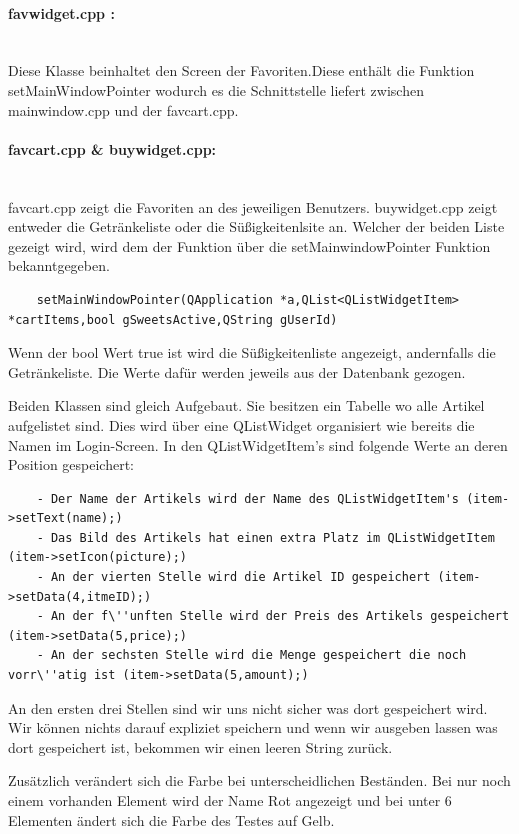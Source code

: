 \documentclass[11pt,a4paper]{article} %
\begin{document}
\paragraph{favwidget.cpp :} $\;$ \\
	Diese Klasse beinhaltet den Screen der Favoriten.Diese enthält die Funktion setMainWindowPointer wodurch es die Schnittstelle liefert zwischen mainwindow.cpp und der favcart.cpp.
\par
\paragraph{favcart.cpp \& buywidget.cpp:} $\;$ \\	
	favcart.cpp zeigt die Favoriten an des jeweiligen Benutzers. buywidget.cpp zeigt entweder die Getränkeliste oder die Süßigkeitenlsite an.
	Welcher der beiden Liste gezeigt wird, wird dem der Funktion über die setMainwindowPointer Funktion bekanntgegeben.
	
	\begin{frame}

\begin{lstlisting}
	setMainWindowPointer(QApplication *a,QList<QListWidgetItem> *cartItems,bool gSweetsActive,QString gUserId)
	\end{lstlisting}
\end{frame}
	Wenn der bool Wert true ist wird die Süßigkeitenliste angezeigt, andernfalls die Getränkeliste. Die Werte dafür werden jeweils aus der Datenbank gezogen.
\par	
	Beiden Klassen sind gleich Aufgebaut. Sie besitzen ein Tabelle wo alle Artikel aufgelistet sind. Dies wird über eine QListWidget organisiert wie bereits die Namen im Login-Screen.
	In den QListWidgetItem's sind folgende Werte an deren Position gespeichert:
	
	\begin{frame}

\begin{lstlisting}
	- Der Name der Artikels wird der Name des QListWidgetItem's (item->setText(name);)
	- Das Bild des Artikels hat einen extra Platz im QListWidgetItem (item->setIcon(picture);)
	- An der vierten Stelle wird die Artikel ID gespeichert (item->setData(4,itmeID);)
	- An der f\''unften Stelle wird der Preis des Artikels gespeichert (item->setData(5,price);)
	- An der sechsten Stelle wird die Menge gespeichert die noch vorr\''atig ist (item->setData(5,amount);)
	\end{lstlisting}
\end{frame}
\par
	An den ersten drei Stellen sind wir uns nicht sicher was dort gespeichert wird.
	Wir können nichts darauf expliziet speichern und wenn wir ausgeben lassen was dort gespeichert ist, bekommen wir einen leeren String zurück.
\par	
	Zusätzlich verändert sich die Farbe bei unterscheidlichen Beständen. Bei nur noch einem vorhanden Element wird der Name Rot angezeigt und bei unter 6 Elementen ändert sich die Farbe des Testes auf Gelb.
\par	
\end{document}
